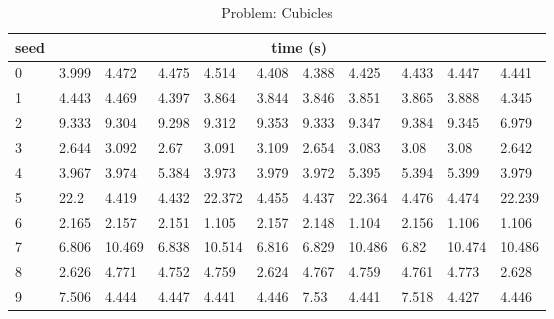 \documentclass{article}
\begin{document}
\begin{table}

\begin{center}
\begin{tabular}{ p{0.5cm}| p{1cm} p{1cm} p{1cm} p{1cm} p{1cm} p{1cm} p{1cm} p{1cm} p{1cm} p{1cm} }
seed & \multicolumn{10}{c}{time (s)} \\
\hline
0 & 3.999 & 4.472 & 4.475 & 4.514 & 4.408 & 4.388 & 4.425 & 4.433 & 4.447 & 4.441 \\
1 & 4.443 & 4.469 & 4.397 & 3.864 & 3.844 & 3.846 & 3.851 & 3.865 & 3.888 & 4.345 \\
2 & 9.333 & 9.304 & 9.298 & 9.312 & 9.353 & 9.333 & 9.347 & 9.384 & 9.345 & 6.979 \\
3 & 2.644 & 3.092 & 2.67 & 3.091 & 3.109 & 2.654 & 3.083 & 3.08 & 3.08 & 2.642 \\
4 & 3.967 & 3.974 & 5.384 & 3.973 & 3.979 & 3.972 & 5.395 & 5.394 & 5.399 & 3.979 \\
5 & 22.2 & 4.419 & 4.432 & 22.372 & 4.455 & 4.437 & 22.364 & 4.476 & 4.474 & 22.239 \\
6 & 2.165 & 2.157 & 2.151 & 1.105 & 2.157 & 2.148 & 1.104 & 2.156 & 1.106 & 1.106 \\
7 & 6.806 & 10.469 & 6.838 & 10.514 & 6.816 & 6.829 & 10.486 & 6.82 & 10.474 & 10.486 \\
8 & 2.626 & 4.771 & 4.752 & 4.759 & 2.624 & 4.767 & 4.759 & 4.761 & 4.773 & 2.628 \\
9 & 7.506 & 4.444 & 4.447 & 4.441 & 4.446 & 7.53 & 4.441 & 7.518 & 4.427 & 4.446
\end{tabular}
\end{center}
\caption{Problem: Cubicles}
\end{table}
\end{document}
